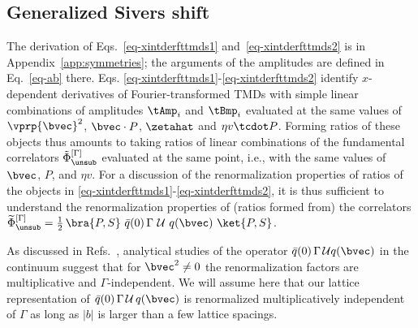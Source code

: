 \subsection{Generalized Sivers shift}
\label{sec:sivers_shift_amplitudes}
The derivation of Eqs.~\eqref{eq-xintderfttmds1} and~\eqref{eq-xintderfttmds2} is in Appendix~\ref{app:symmetries}; the arguments of the amplitudes are defined in Eq.~\eqref{eq-ab} there. Eqs. \eqref{eq-xintderfttmds1}-\eqref{eq-xintderfttmds2} identify $x$-dependent derivatives of Fourier-transformed TMDs with simple linear combinations of amplitudes $\tAmp_i$ and $\tBmp_i$ evaluated at the same values of $\vprp{\bvec}^2$, $\bvec \cdot P$, $\zetahat$ and $\eta v \tcdot P$. Forming ratios of these objects thus amounts to taking ratios of linear combinations of the fundamental correlators $\tilde \Phi^{[\Gamma]}_\unsub$ evaluated at the same point, i.e., with the same values of $\bvec$, $P$, and $\eta v$. For a discussion of the renormalization properties of ratios of the objects in \eqref{eq-xintderfttmds1}-\eqref{eq-xintderfttmds2}, it is thus sufficient to understand the renormalization properties of (ratios formed from) the correlators $\widetilde \Phi^{[\Gamma]}_\unsub = \frac{1}{2} \, \bra{P, S}\ \bar{q}(0)\, \Gamma\ \mathcal{U}\ q(\bvec)\ \ket{P, S} $.

As discussed in Refs.~\cite{Musch:2011er, Yoon:2017qzo}, analytical studies of the operator $\bar{q}(0)\, \Gamma\, \mathcal{U} q(\bvec)$ in the continuum suggest that for $\bvec^2 \neq 0$ the renormalization factors are multiplicative and $\Gamma$-independent. We will assume here that our lattice representation of $\bar{q}(0)\, \Gamma\, \mathcal{U}\, q(\bvec)$ is renormalized multiplicatively independent of $\Gamma$ as long as $|b|$ is larger than a few lattice spacings. %

